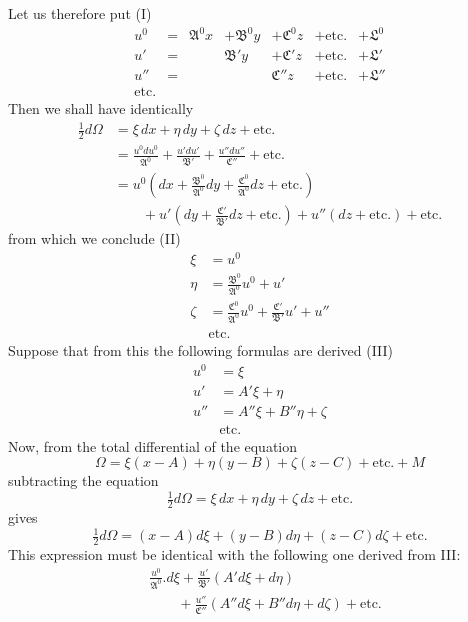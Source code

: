 Let us therefore put (I)
\[
\begin{array}{rclllll}
u^0&=&\mathfrak{A}^0x&+\mathfrak{B}^0y&+\mathfrak{C}^0z&+\text{etc.}&+\mathfrak{L}^0\\
u'&=&&\mathfrak{B}'y&+\mathfrak{C}'z&+\text{etc.}&+\mathfrak{L}'\\
u''&=&&&\mathfrak{C}''z&+\text{etc.}&+\mathfrak{L}''\\
\text{etc.}
\end{array}
\]
Then we shall have identically
\[
\begin{aligned}
\tfrac12d\Omega&=\xi\,dx+\eta\,dy+\zeta\,dz+\text{etc.}\\[3pt]
&=\frac{u^0du^0}{\mathfrak{A}^0}+\frac{u'du'}{\mathfrak{B}'}+\frac{u''du''}{\mathfrak{C}''}+\text{etc.}\\[3pt]
&=u^0\left(dx+\frac{\mathfrak{B}^0}{\mathfrak{A}^0}dy+\frac{\mathfrak{C}^0}{\mathfrak{A}^0}dz+\text{etc.}\right)\\
&\qquad+u'\left(dy+\frac{\mathfrak{C}'}{\mathfrak{B}'}dz+\text{etc.}\right)+u''(dz+\text{etc.})+\text{etc.}
\end{aligned}
\]
from which we conclude (II)
\[
\begin{aligned}
\xi&=u^0\\
\eta&=\frac{\mathfrak{B}^0}{\mathfrak{A}^0}u^0+u'\\
\zeta&=\frac{\mathfrak{C}^0}{\mathfrak{A}^0}u^0+\frac{\mathfrak{C}'}{\mathfrak{B}'}u'+u''\\
&\text{etc.}
\end{aligned}
\]
Suppose that from this the following formulas are derived (III)
\[
\begin{aligned}
u^0&=\xi\\
u'&=A'\xi+\eta\\
u''&=A''\xi+B''\eta+\zeta\\
&\text{etc.}
\end{aligned}
\]
Now, from the total differential of the equation
\[
\Omega=\xi(x-A)+\eta(y-B)+\zeta(z-C)+\text{etc.}+M
\]
subtracting the equation
\[
\tfrac12d\Omega=\xi\,dx+\eta\,dy+\zeta\,dz+\text{etc.}
\]
gives
\[
\tfrac12d\Omega=(x-A)d\xi+(y-B)d\eta+(z-C)d\zeta+\text{etc.}
\]
This expression must be identical with the following one derived from III:
\[
\begin{aligned}
&\frac{u^0}{\mathfrak{A}^0}.d\xi+\frac{u'}{\mathfrak{B}'}(A'd\xi+d\eta)\\
&\qquad+\frac{u''}{\mathfrak{C}''}(A''d\xi+B''d\eta+d\zeta)+\text{etc.}
\end{aligned}
\]
